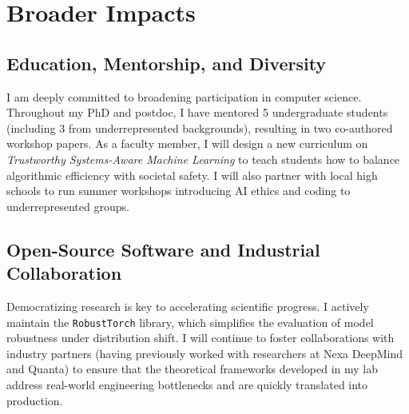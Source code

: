 \section{Broader Impacts}
\subsection{Education, Mentorship, and Diversity}
I am deeply committed to broadening participation in computer science. Throughout my PhD and postdoc, I have mentored 5 undergraduate students (including 3 from underrepresented backgrounds), resulting in two co-authored workshop papers. As a faculty member, I will design a new curriculum on \emph{Trustworthy Systems-Aware Machine Learning} to teach students how to balance algorithmic efficiency with societal safety. I will also partner with local high schools to run summer workshops introducing AI ethics and coding to underrepresented groups.

\subsection{Open-Source Software and Industrial Collaboration}
Democratizing research is key to accelerating scientific progress. I actively maintain the \texttt{RobustTorch} library, which simplifies the evaluation of model robustness under distribution shift. I will continue to foster collaborations with industry partners (having previously worked with researchers at Nexa DeepMind and Quanta) to ensure that the theoretical frameworks developed in my lab address real-world engineering bottlenecks and are quickly translated into production.

